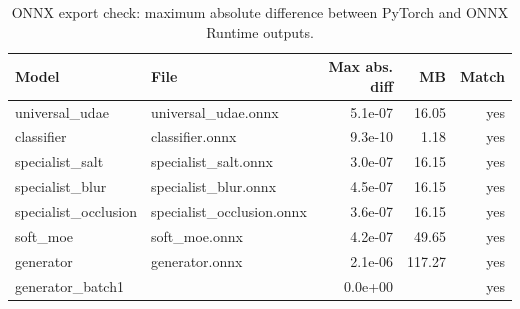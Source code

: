 \begin{table}[t]
\centering
\caption{ONNX export check: maximum absolute difference between PyTorch and ONNX Runtime outputs.}
\label{tab:onnx}
\footnotesize
\begin{tabular}{llrrr}
\toprule
Model & File & Max abs. diff & MB & Match \\
\midrule
universal\_udae & universal\_udae.onnx & 5.1e-07 & 16.05 & yes \\
classifier & classifier.onnx & 9.3e-10 & 1.18 & yes \\
specialist\_salt & specialist\_salt.onnx & 3.0e-07 & 16.15 & yes \\
specialist\_blur & specialist\_blur.onnx & 4.5e-07 & 16.15 & yes \\
specialist\_occlusion & specialist\_occlusion.onnx & 3.6e-07 & 16.15 & yes \\
soft\_moe & soft\_moe.onnx & 4.2e-07 & 49.65 & yes \\
generator & generator.onnx & 2.1e-06 & 117.27 & yes \\
generator\_batch1 &  & 0.0e+00 &  & yes \\
\bottomrule
\end{tabular}
\end{table}
